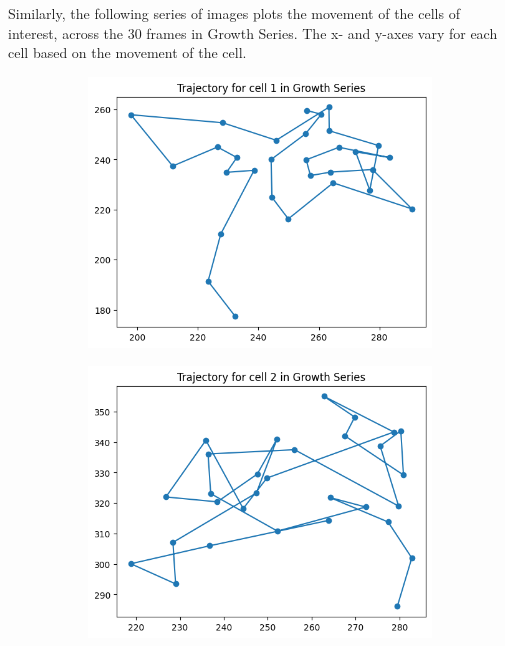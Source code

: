 \documentclass{article}
\begin{document}
Similarly, the following series of images plots the movement of the cells of interest, across the 30 frames in Growth Series. The x- and y-axes vary for each cell based on the movement of the cell. 
\begin{figure}[h!]
    \centering
    \begin{subfigure}[b]{0.5\linewidth}
        \centering
        \includegraphics[width=\linewidth]{Report/Appendix_Images/Trajectory-B-Growth/trajectory_1.png}       
    \end{subfigure}%
    \begin{subfigure}[b]{0.5\linewidth}
        \centering
        \includegraphics[width=\linewidth]{Report/Appendix_Images/Trajectory-B-Growth/trajectory_2.png}

\end{subfigure}
\end{figure}
\end{document}
